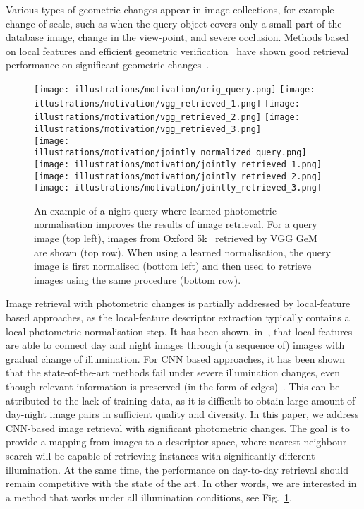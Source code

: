 Various types of geometric changes appear in image collections, for example change of scale, such as when the query object covers only a small part of the database image, change in the view-point, and severe occlusion. Methods based on local features and efficient geometric verification~\cite{Stewenius-ECCV12} have shown good retrieval performance on significant geometric changes~\cite{Mikulik-SISAP13,Mikulik-ACCV14}.

\begin{figure}[t] \centering
    \texttt{[image: illustrations/motivation/orig\_query.png]}
    \hspace{0.6cm}
    \texttt{[image: illustrations/motivation/vgg\_retrieved\_1.png]}
    \texttt{[image: illustrations/motivation/vgg\_retrieved\_2.png]}
    \texttt{[image: illustrations/motivation/vgg\_retrieved\_3.png]}
\\
    \texttt{[image: illustrations/motivation/jointly\_normalized\_query.png]} \hspace{0.6cm}
    \texttt{[image: illustrations/motivation/jointly\_retrieved\_1.png]}
    \texttt{[image: illustrations/motivation/jointly\_retrieved\_2.png]}
    \texttt{[image: illustrations/motivation/jointly\_retrieved\_3.png]}\\[2pt]

    \caption{An example of a night query where learned photometric normalisation improves the results of image retrieval. For a query image (top left), images from Oxford 5k~\cite{Radenovic-CVPR18} retrieved by VGG GeM~\cite{Radenovic-TPAMI18} are shown (top row). When using a learned normalisation, the query image is first normalised (bottom left) and then used to retrieve images using the same procedure (bottom row).}
\label{fig:motivation}
\end{figure}
 
Image retrieval with photometric changes is partially addressed by local-feature based approaches, as the local-feature descriptor extraction typically contains a local photometric normalisation step. It has been shown, \eg in~\cite{Radenovic-CVPR16}, that local features are able to connect day and night images through (a sequence of) images with gradual change of illumination. 
For CNN based approaches, it has been shown that the state-of-the-art methods fail under severe illumination changes, even though relevant information is preserved (\eg in the form of edges)~\cite{Radenovic-ECCV18}.
This can be attributed to the lack of training data, as it is difficult to obtain large amount of day-night image pairs in sufficient quality and diversity. In this paper, we address CNN-based image retrieval with significant photometric changes. The goal is to provide a mapping from images to a descriptor space, where nearest neighbour search will be capable of retrieving instances with significantly different illumination. At the same time, the performance on day-to-day retrieval should remain competitive with the state of the art. In other words, we are interested in a method that works under all illumination conditions, see Fig.~\ref{fig:motivation}.

